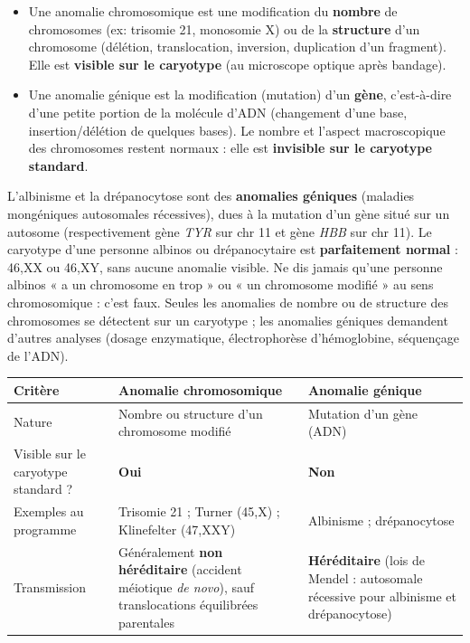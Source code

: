 \documentclass[11pt]{article}
\newcommand{\cle}[1]{{\popxbold\color{popdark}#1}}
\begin{document}
\begin{definition}
\begin{itemize}
\item Une \cle{anomalie chromosomique} est une modification du \textbf{nombre} de chromosomes (ex: trisomie 21, monosomie X) ou de la \textbf{structure} d'un chromosome (délétion, translocation, inversion, duplication d'un fragment). Elle est \textbf{visible sur le caryotype} (au microscope optique après bandage).
\item Une \cle{anomalie génique} est la modification (\cle{mutation}) d'un \textbf{gène}, c'est-à-dire d'une petite portion de la molécule d'ADN (changement d'une base, insertion/délétion de quelques bases). Le nombre et l'aspect macroscopique des chromosomes restent normaux : elle est \textbf{invisible sur le caryotype standard}.
\end{itemize}
\end{definition}

\begin{attention}
L'\cle{albinisme} et la \cle{drépanocytose} sont des \textbf{anomalies géniques} (maladies mongéniques autosomales récessives), dues à la mutation d'un gène situé sur un autosome (respectivement gène \emph{TYR} sur chr 11 et gène \emph{HBB} sur chr 11). Le caryotype d'une personne albinos ou drépanocytaire est \textbf{parfaitement normal} : 46,XX ou 46,XY, sans aucune anomalie visible. Ne dis jamais qu'une personne albinos « a un chromosome en trop » ou « un chromosome modifié » au sens chromosomique : c'est faux. Seules les anomalies de nombre ou de structure des chromosomes se détectent sur un caryotype ; les anomalies géniques demandent d'autres analyses (dosage enzymatique, électrophorèse d'hémoglobine, séquençage de l'ADN).
\end{attention}

\begin{center}
\begin{tabularx}{\linewidth}{|l|X|X|}
\hline
\rowcolor{popblueL} \textbf{Critère} & \textbf{Anomalie chromosomique} & \textbf{Anomalie génique} \\
\hline
Nature & Nombre ou structure d'un chromosome modifié & Mutation d'un gène (ADN) \\
\hline
Visible sur le caryotype standard ? & \textbf{Oui} & \textbf{Non} \\
\hline
Exemples au programme & Trisomie 21 ; Turner (45,X) ; Klinefelter (47,XXY) & Albinisme ; drépanocytose \\
\hline
Transmission & Généralement \textbf{non héréditaire} (accident méiotique \emph{de novo}), sauf translocations équilibrées parentales & \textbf{Héréditaire} (lois de Mendel : autosomale récessive pour albinisme et drépanocytose) \\
\hline
\end{tabularx}
\end{center}
\end{document}
